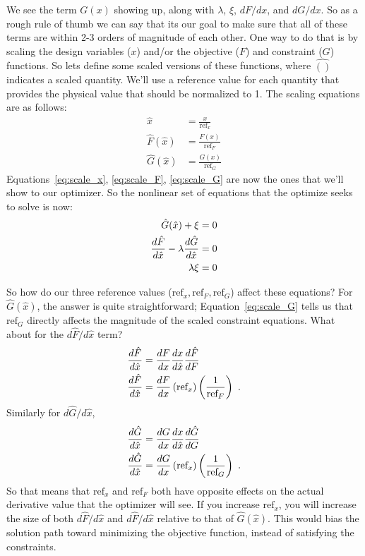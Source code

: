 \documentclass[conf]{new-aiaa}
\begin{document}
    We see the term $G(x)$ showing up, along with $\lambda$, $\xi$, $dF/dx$, and $dG/dx$. 
    So as a rough rule of thumb we can say that its our goal to make sure that all of these terms are within 2-3 orders of magnitude of each other. 
    One way to do that is by scaling the design variables ($x$) and/or the objective ($F$) and constraint ($G$) functions. 
    So lets define some scaled versions of these functions, where $\hat{()}$ indicates a scaled quantity. 
    We'll use a reference value for each quantity that provides the physical value that should be normalized to 1. The scaling equations are as follows:
    \begin{align}
        \hat{x} &= \frac{x}{\text{ref}_x} \label{eq:scale_x}\\
        \hat{F}(\hat{x}) &= \frac{F(x)}{\text{ref}_F} \label{eq:scale_F}\\
        \hat{G}(\hat{x}) &= \frac{G(x)}{\text{ref}_G} \label{eq:scale_G}
    \end{align}
    Equations~\eqref{eq:scale_x}, \eqref{eq:scale_F}, \eqref{eq:scale_G} are now the ones that we'll show to our optimizer. 
    So the nonlinear set of equations that the optimize seeks to solve is now: 
    \begin{align}
        \hat{G}(\hat{x}) + \xi &= 0 \notag \\
        \frac{d\hat{F}}{d\hat{x}} - \lambda \frac{d\hat{G}}{d\hat{x}} &= 0 \notag \\
        \lambda \xi &= 0
        \label{eq:almost_kkt_scaled}
    \end{align}

    So how do our three reference values ($\text{ref}_x, \text{ref}_F, \text{ref}_G$) affect these equations? 
    For $\hat{G}(\hat{x})$, the answer is quite straightforward; 
    Equation~\eqref{eq:scale_G} tells us that $\text{ref}_G$ directly affects the magnitude of the scaled constraint equations. 
    What about for the $d \hat{F}/d\hat{x}$ term? 
    \begin{align}
        \frac{d\hat{F}}{d\hat{x}} &= \frac{dF}{dx} \frac{dx}{d\hat{x}} \frac{d\hat{F}}{dF} \notag \\
        \frac{d\hat{F}}{d\hat{x}} &= \frac{dF}{dx} \left(\text{ref}_x \right) \left(\frac{1}{\text{ref}_F}\right) \ .
    \end{align}
    Similarly for $d \hat{G}/d\hat{x}$, 
    \begin{align}
        \frac{d\hat{G}}{d\hat{x}} &= \frac{dG}{dx} \frac{dx}{d\hat{x}} \frac{d\hat{G}}{dG} \notag \\
        \frac{d\hat{G}}{d\hat{x}} &= \frac{dG}{dx} \left(\text{ref}_x \right) \left(\frac{1}{\text{ref}_G}\right) \ .
    \end{align}
    So that means that $\text{ref}_x$ and $\text{ref}_F$ both have opposite effects on the actual derivative value that the optimizer will see. 
    If you increase $\text{ref}_x$, you will increase the size of both $d\hat{F}/d\hat{x}$ and $d\hat{F}/d\hat{x}$ relative to that of $\hat{G}(\hat{x})$. 
    This would bias the solution path toward minimizing the objective function, instead of satisfying the constraints. 
\end{document}
